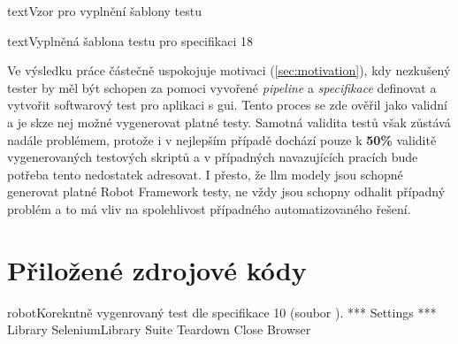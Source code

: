 \documentclass[czech, ma, kiv, he, iso690numb, pdf, viewonly]{fasthesis}
\begin{document}
\begin{code}{text}{Vzor pro vyplnění šablony testu \label{lst:template}}
{\begin{code}{text}{Vyplněná šablona testu pro specifikaci 18 \label{lst:spec18}}
{    Ve výsledku práce částečně uspokojuje motivaci (\ref{sec:motivation}), kdy nezkušený tester by měl být schopen za pomoci vyvořené \textit{pipeline} a \textit{specifikace} definovat a vytvořit softwarový test pro aplikaci s \Acrshort{gui}. Tento proces se zde ověřil jako validní a je skze nej možné vygenerovat platné testy. Samotná validita testů však zůstává nadále problémem, protože i v nejlepším případě dochází pouze k \textbf{50\%} validitě vygenerovaných testových skriptů a v případných navazujících pracích bude potřeba tento nedostatek adresovat. I přesto, že \Gls{llm} modely jsou schopné generovat platné Robot Framework testy, ne vždy jsou schopny odhalit případný problém a to má vliv na spolehlivost případného automatizovaného řešení.

\appendix

    \chapter{Přiložené zdrojové kódy} \label{sec:appendix:src}

    \begin{code}{robot}{Korekntně vygenrovaný test dle specifikace 10 (soubor ). \label{lst:gpt4:spec-10-3}}
*** Settings ***
Library           SeleniumLibrary
Suite Teardown    Close Browser


\end{code}}
\end{code}}
\end{code}
\end{document}

